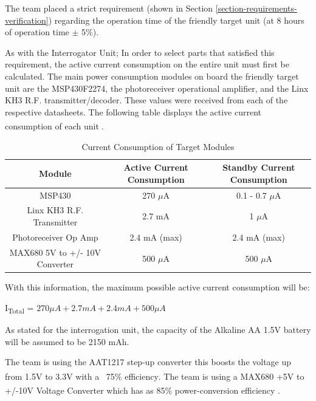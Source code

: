 \documentclass[letterpaper,10pt]{article}
\begin{document}
\begin{spacing}{1.15}
The team placed a strict requirement (shown in Section \ref{section-requirements-verification}) regarding the operation time of the friendly target unit (at 8 hours of operation time $\pm$ 5\%).

As with the Interrogator Unit; In order to select parts that satisfied this requirement, the active current consumption on the entire unit must first be calculated. The main power consumption modules on board the friendly target unit are the MSP430F2274, the photoreceiver operational amplifier, and the Linx KH3 R.F. transmitter/decoder. These values were received from each of the respective datasheets. The following table displays the active current consumption of each unit\textsuperscript{\cite{MSP430F2274} \cite{Linx-Receiver} \cite{Laser}}. 


\begin{table}[htbp]
	\centering
	\begin{tabular}{c|c|c}	%
		\toprule	%
		Module & Active Current Consumption & Standby Current Consumption\\
		\midrule
		MSP430 & 270 $\mu$A & 0.1 - 0.7 $\mu$A\\ 
		Linx KH3 R.F. Transmitter & 2.7 mA & 1 $\mu$A\\
		Photoreceiver Op Amp & 2.4 mA (max) & 2.4 mA (max) \\
		MAX680 5V to +/- 10V Converter & 500 $\mu$A  & 500 $\mu$A \\
		\bottomrule	%
	\end{tabular}%
	\caption{Current Consumption of Target Modules}
	\label{tab:table2}	%
\end{table}%

With this information, the maximum possible active current consumption will be:
\begin{center}{I\textsubscript{Total} = $270 \mu A + 2.7 mA + 2.4 mA + 500 \mu A$}\end{center}

As stated for the interrogation unit, the capacity of the Alkaline AA 1.5V battery will be assumed to be 2150 mAh. 

The team is using the AAT1217 step-up converter this boosts the voltage up from 1.5V to 3.3V with a ~75\% efficiency\textsuperscript{\cite{AAT1217}}. The team is using a MAX680 +5V to +/-10V Voltage Converter which has as 85\% power-conversion efficiency \textsuperscript{\cite{MAX680}} . 


\end{spacing}
\end{document}
